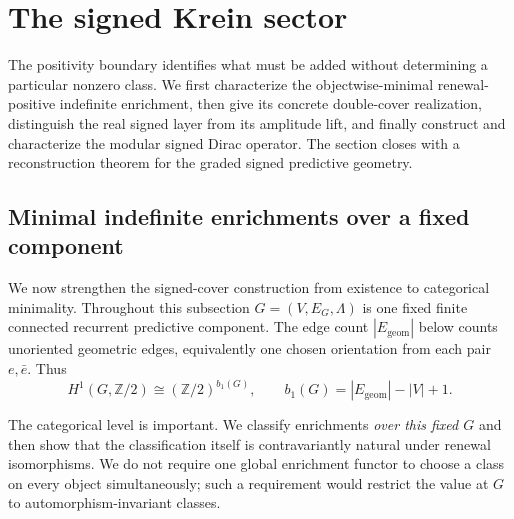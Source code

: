 \documentclass[11pt]{article}
\theoremstyle{definition}
\theoremstyle{remark}
\newcommand{\Z}{\mathbb{Z}}
\begin{document}
\section{The signed Krein sector}
\label{sec:signed}

The positivity boundary identifies what must be added without determining a
particular nonzero class.  We first characterize the objectwise-minimal
renewal-positive indefinite enrichment, then give its concrete double-cover
realization, distinguish the real signed layer from its amplitude lift, and
finally construct and characterize the modular signed Dirac operator.  The
section closes with a reconstruction theorem for the graded signed predictive
geometry.

\subsection{Minimal indefinite enrichments over a fixed component}
\label{sec:setup}
\label{sec:signed-reconstruction}

We now strengthen the signed-cover construction from existence to categorical
minimality.  Throughout this subsection \(G=(V,E_G,\Lambda)\) is one fixed
finite connected recurrent predictive component.  The edge count
\(|E_{\mathrm{geom}}|\) below counts unoriented geometric edges, equivalently one
chosen orientation from each pair \(e,\bar e\).  Thus
\[
  H^1(G,\Z/2)\cong(\Z/2)^{b_1(G)},\qquad
  b_1(G)=|E_{\mathrm{geom}}|-|V|+1.
\]

The categorical level is important.  We classify enrichments \emph{over this
fixed \(G\)} and then show that the classification itself is contravariantly
natural under renewal isomorphisms.  We do not require one global enrichment
functor to choose a class on every object simultaneously; such a requirement
would restrict the value at \(G\) to automorphism-invariant classes.
\end{document}
